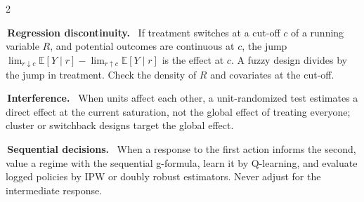 \documentclass[10pt]{article}
\newcommand{\E}{\mathbb{E}}
\newcommand{\term}[1]{\par\vspace{0.12em}{\color{sbgreen}\ding{113}}\,\textbf{#1.}\ }
\begin{document}
\begin{multicols*}{2}
\term{Regression discontinuity} If treatment switches at a cut-off $c$ of a running variable $R$, and potential outcomes are
continuous at $c$, the jump $\lim_{r \downarrow c}\E[Y \mid r] - \lim_{r \uparrow c}\E[Y \mid r]$ is the effect at $c$. A fuzzy
design divides by the jump in treatment. Check the density of $R$ and covariates at the cut-off.

\term{Interference} When units affect each other, a unit-randomized test estimates a direct effect at the current saturation,
not the global effect of treating everyone; cluster or switchback designs target the global effect.

\term{Sequential decisions} When a response to the first action informs the second, value a regime with the sequential
g-formula, learn it by Q-learning, and evaluate logged policies by IPW or doubly robust estimators. Never adjust for the
intermediate response.

\end{multicols*}
\end{document}
